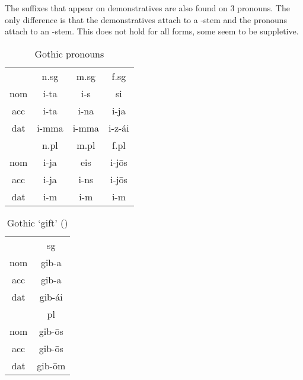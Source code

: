 The suffixes that appear on demonstratives are also found on 3 pronouns. The only difference is that the demonstratives attach to a -stem and the pronouns attach to an -stem. This does not hold for all forms, some seem to be suppletive.

\begin{table}[H]
	\center
	\caption {Gothic  pronouns}
		\begin{tabular}{cccc}
		\toprule
							& \ac{n}.\ac{sg} 	& \ac{m}.\ac{sg}	& \ac{f}.\ac{sg}  \\
		 						\cmidrule{2-4}
    \ac{nom} 	& i-ta   	 			  & i-s  			  		& si		    			\\
    \ac{acc}	& i-ta    	   		& i-na  	  	 		& i-ja     				\\
    \ac{dat} 	& i-mma 		   		& i-mma  			   	& i-z-ái  	  		\\
		\bottomrule
    					& \ac{n}.\ac{pl}	& \ac{m}.\ac{pl}	& \ac{f}.\ac{pl}	\\
						    \cmidrule{2-4}
    \ac{nom} 	& i-ja  					&	eis    					&	i-jōs  					\\
    \ac{acc} 	& i-ja   					&	i-ns    				&	i-jōs 					\\
    \ac{dat} 	& i-m     				&	i-m      				&	i-m     				\\
    \bottomrule
		\end{tabular}
\end{table}




\begin{table}[H]
	\center
	\caption {Gothic  `gift' ()}
		\begin{tabular}{cc}
		\toprule
							& \ac{sg}       \\
		 						\cmidrule{2-2}
    \ac{nom} 	& gib-a   	 		\\
    \ac{acc}	& gib-a   	    \\
    \ac{dat} 	& gib-ái  	 		\\
		\bottomrule
    					& \ac{pl}	      \\
						    \cmidrule{2-2}
    \ac{nom} 	& gib-ōs  			\\
    \ac{acc} 	& gib-ōs   			\\
    \ac{dat} 	& gib-ōm     		\\
    \bottomrule
		\end{tabular}
\end{table}

